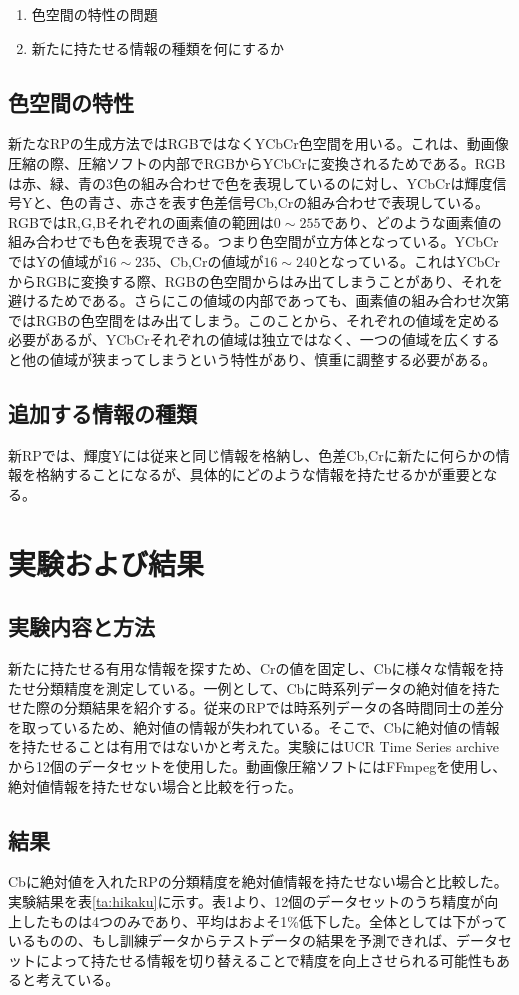 \documentclass{cssotsuken}
\begin{document}
\begin{enumerate}
\item 色空間の特性の問題
\item 新たに持たせる情報の種類を何にするか
\end{enumerate}

\subsection{色空間の特性}
  新たなRPの生成方法ではRGBではなくYCbCr色空間を用いる。これは、動画像圧縮の際、圧縮ソフトの内部でRGBからYCbCrに変換されるためである。RGBは赤、緑、青の3色の組み合わせで色を表現しているのに対し、YCbCrは輝度信号Yと、色の青さ、赤さを表す色差信号Cb,Crの組み合わせで表現している。RGBではR,G,Bそれぞれの画素値の範囲は$0\sim255$であり、どのような画素値の組み合わせでも色を表現できる。つまり色空間が立方体となっている。YCbCrではYの値域が$16\sim235$、Cb,Crの値域が$16\sim240$となっている。これはYCbCrからRGBに変換する際、RGBの色空間からはみ出てしまうことがあり、それを避けるためである。さらにこの値域の内部であっても、画素値の組み合わせ次第ではRGBの色空間をはみ出てしまう。このことから、それぞれの値域を定める必要があるが、YCbCrそれぞれの値域は独立ではなく、一つの値域を広くすると他の値域が狭まってしまうという特性があり、慎重に調整する必要がある。
\subsection{追加する情報の種類}
新RPでは、輝度Yには従来と同じ情報を格納し、色差Cb,Crに新たに何らかの情報を格納することになるが、具体的にどのような情報を持たせるかが重要となる。

\section{実験および結果}
\subsection{実験内容と方法}
新たに持たせる有用な情報を探すため、Crの値を固定し、Cbに様々な情報を持たせ分類精度を測定している。一例として、Cbに時系列データの絶対値を持たせた際の分類結果を紹介する。従来のRPでは時系列データの各時間同士の差分を取っているため、絶対値の情報が失われている。そこで、Cbに絶対値の情報を持たせることは有用ではないかと考えた。実験にはUCR Time Series archiveから12個のデータセットを使用した。動画像圧縮ソフトにはFFmpegを使用し、絶対値情報を持たせない場合と比較を行った。
\subsection{結果}
Cbに絶対値を入れたRPの分類精度を絶対値情報を持たせない場合と比較した。実験結果を表\ref{ta:hikaku}に示す。表1より、12個のデータセットのうち精度が向上したものは4つのみであり、平均はおよそ1\%低下した。全体としては下がっているものの、もし訓練データからテストデータの結果を予測できれば、データセットによって持たせる情報を切り替えることで精度を向上させられる可能性もあると考えている。
\end{document}
